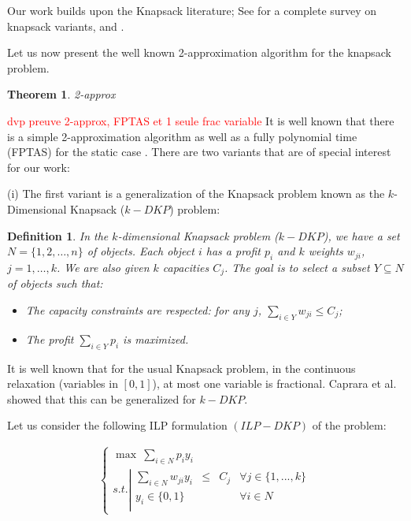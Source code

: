 \documentclass[a4paper]{book}
\newtheorem{theorem}{Theorem}[chapter]
\newtheorem{definition}{Definition}
\newcommand{\alex}[2]{\textcolor{red}{#1}}
\begin{document}

Our work builds upon the {\sc Knapsack} literature; See \cite{Kelerrer} for a complete survey on knapsack variants, and \cite{Ibarra, Lawler, Magazine, Kellerer}.

Let us now present the well known 2-approximation algorithm for the knapsack problem.

\begin{theorem}
2-approx
\end{theorem}
\alex{dvp preuve 2-approx, FPTAS et 1 seule frac variable}\\
It is well known that there is a simple 2-approximation algorithm as well as a fully polynomial time (FPTAS) for the static case . There are two variants that are of special interest for our work: 

(i) The first variant is a  generalization of the {\sc Knapsack} problem known as the $k$-{\sc Dimensional Knapsack} ($k-DKP$) problem:
\begin{definition}
In the $k$-dimensional {\sc Knapsack} problem ($k-DKP$), we have a set $N=\{1,2,\dots,n\}$ of objects. Each object $i$ has a profit $p_i$ and $k$ weights $w_{ji}$, $j=1,\dots,k$. We are also given $k$ capacities $C_j$. The goal is to select a subset $Y\subseteq N$ of objects such that:
\begin{itemize}
  \item The capacity constraints are respected: for any $j$, $\sum_{i\in Y}w_{ji}\leq C_j$;
  \item The profit $\sum_{i\in Y} p_i$ is maximized. 
\end{itemize} 
\end{definition}

It is well known that for the usual {\sc Knapsack} problem, in the continuous relaxation (variables in $[0,1]$), at most one variable is fractional. Caprara et al.
\cite{Carpara} showed that this can be generalized for $k-DKP$.

Let us consider the following ILP formulation $(ILP-DKP)$ of the problem:

   \begin{eqnarray*}
     \ \left \{ \begin{array}{ll}
    \max \ \sum\limits_{i \in N} p_{i} y_{i}   \\
    s.t. \left |
    \begin{array}{llllll}
    \sum\limits_{i \in N} w_{ji} y_{i} & \leq &C_j & \forall{j} \in \{1,...,k\} \\
    y_{i} \in \{0,1\} & & & \forall{i} \in N\\
    \end{array}
    \right.
    \end{array} 
    \right.
    \end{eqnarray*}
\end{document}
